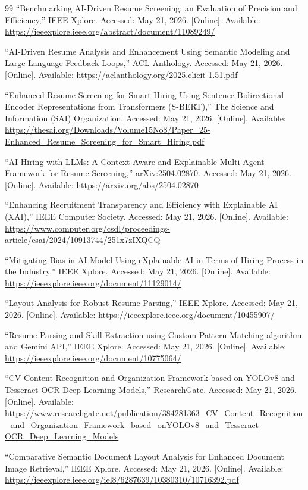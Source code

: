 \begin{thebibliography}{99}
``Benchmarking AI-Driven Resume Screening: an Evaluation of Precision and Efficiency,'' IEEE Xplore. Accessed: May 21, 2026. [Online]. Available: \url{https://ieeexplore.ieee.org/abstract/document/11089249/}

``AI-Driven Resume Analysis and Enhancement Using Semantic Modeling and Large Language Feedback Loops,'' ACL Anthology. Accessed: May 21, 2026. [Online]. Available: \url{https://aclanthology.org/2025.clicit-1.51.pdf}

``Enhanced Resume Screening for Smart Hiring Using Sentence-Bidirectional Encoder Representations from Transformers (S-BERT),'' The Science and Information (SAI) Organization. Accessed: May 21, 2026. [Online]. Available: \url{https://thesai.org/Downloads/Volume15No8/Paper_25-Enhanced_Resume_Screening_for_Smart_Hiring.pdf}

``AI Hiring with LLMs: A Context-Aware and Explainable Multi-Agent Framework for Resume Screening,'' arXiv:2504.02870. Accessed: May 21, 2026. [Online]. Available: \url{https://arxiv.org/abs/2504.02870}

``Enhancing Recruitment Transparency and Efficiency with Explainable AI (XAI),'' IEEE Computer Society. Accessed: May 21, 2026. [Online]. Available: \url{https://www.computer.org/csdl/proceedings-article/esai/2024/10913744/251x7zIXQCQ}

``Mitigating Bias in AI Model Using eXplainable AI in Terms of Hiring Process in the Industry,'' IEEE Xplore. Accessed: May 21, 2026. [Online]. Available: \url{https://ieeexplore.ieee.org/document/11129014/}

``Layout Analysis for Robust Resume Parsing,'' IEEE Xplore. Accessed: May 21, 2026. [Online]. Available: \url{https://ieeexplore.ieee.org/document/10455907/}

``Resume Parsing and Skill Extraction using Custom Pattern Matching algorithm and Gemini API,'' IEEE Xplore. Accessed: May 21, 2026. [Online]. Available: \url{https://ieeexplore.ieee.org/document/10775064/}

``CV Content Recognition and Organization Framework based on YOLOv8 and Tesseract-OCR Deep Learning Models,'' ResearchGate. Accessed: May 21, 2026. [Online]. Available: \url{https://www.researchgate.net/publication/384281363_CV_Content_Recognition_and_Organization_Framework_based_onYOLOv8_and_Tesseract-OCR_Deep_Learning_Models}

``Comparative Semantic Document Layout Analysis for Enhanced Document Image Retrieval,'' IEEE Xplore. Accessed: May 21, 2026. [Online]. Available: \url{https://ieeexplore.ieee.org/iel8/6287639/10380310/10716392.pdf}

\end{thebibliography}
